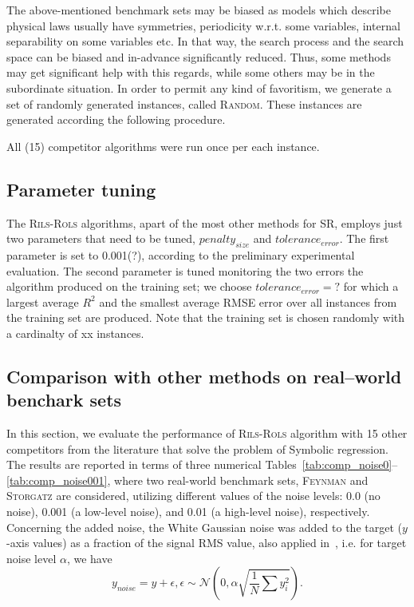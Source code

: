 \documentclass[a4paper,12pt]{elsarticle}
\begin{document}
The above-mentioned benchmark sets may be biased as models which describe physical laws usually have  symmetries, periodicity w.r.t. some variables, internal separability on some variables etc. In that way, the search process and the search space can be biased and in-advance significantly reduced. Thus, some methods may get significant help with this regards, while some others may be in the subordinate situation. 
  In order to permit any kind of favoritism, we generate a set of randomly generated instances, called \textsc{Random}. These instances are generated according the following procedure. 

All (15) competitor algorithms were run once per each instance.  

\subsection{Parameter tuning}
The \textsc{Rils}-\textsc{Rols} algorithms, apart of the most other methods for SR, employs just two parameters that need to be tuned, $penalty_{size}$ and $tolerance_{error}$. The first parameter is set to 0.001(?), according to the preliminary experimental evaluation. The second parameter is tuned monitoring the two errors the algorithm produced on the training set; we choose $tolerance_{error}=?$ for which a largest average $R^2$ and the smallest average RMSE error over all instances from the training set are produced. Note that the training set is chosen randomly with a cardinalty of xx instances. 


\subsection{Comparison with other methods on real--world benchark sets}
In this section, we evaluate the performance of \textsc{Rils-Rols} algorithm with 15 other competitors from the literature that solve the problem of Symbolic regression. The results are reported in terms of three numerical Tables~\ref{tab:comp_noise0}--\ref{tab:comp_noise001}, where two real-world benchmark sets, \textsc{Feynman} and \textsc{Storgatz} are considered, utilizing  different values of the noise levels: 0.0 (no noise), 0.001 (a low-level noise), and 0.01 (a high-level noise), respectively. Concerning the added noise, the White Gaussian noise was added to the target ($y$-axis values) as a fraction of the signal RMS value, also applied in~\cite{la2021contemporary}, i.e. for target noise level $\alpha$, we have
$$ y_{noise} = y + \epsilon, \epsilon \sim \mathcal{N}\left(0, \alpha \sqrt{\frac{1}{N} \sum {y_i^2}}\right). $$
\end{document}
